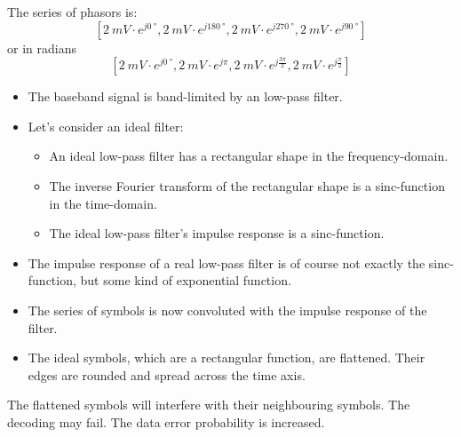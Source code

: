 \begin{solution}
\begin{tasks}
		The series of phasors is:
		\begin{equation*}
			\left[\SI{2}{mV} \cdot e^{j \SI{0}{\degree}}, \SI{2}{mV} \cdot e^{j \SI{180}{\degree}}, \SI{2}{mV} \cdot e^{j \SI{270}{\degree}}, \SI{2}{mV} \cdot e^{j \SI{90}{\degree}}\right]
		\end{equation*}
		or in radians
		\begin{equation*}
			\left[\SI{2}{mV} \cdot e^{j \SI{0}{\degree}}, \SI{2}{mV} \cdot e^{j \pi}, \SI{2}{mV} \cdot e^{j \frac{3 \pi}{2}}, \SI{2}{mV} \cdot e^{j \frac{\pi}{2}}\right]
		\end{equation*}
		
		\task
		\begin{itemize}
			\item The baseband signal is band-limited by an low-pass filter.
			\item Let's consider an ideal filter:
			\begin{itemize}
				\item An ideal low-pass filter has a rectangular shape in the frequency-domain.
				\item The inverse Fourier transform of the rectangular shape is a sinc-function in the time-domain.
				\item The ideal low-pass filter's impulse response is a sinc-function.
			\end{itemize}
			\item \begin{remark}The impulse response of a real low-pass filter is of course not exactly the sinc-function, but some kind of exponential function.\end{remark}
			\item The series of symbols is now convoluted with the impulse response of the filter.
			\item The ideal symbols, which are a rectangular function, are flattened. Their edges are rounded and spread across the time axis.
		\end{itemize}
		The flattened symbols will interfere with their neighbouring symbols. The decoding may fail. The data error probability is increased.
		

\end{tasks}
\end{solution}
